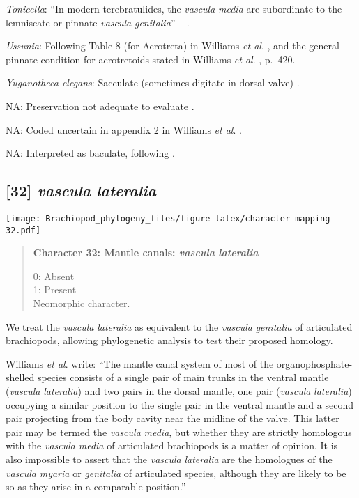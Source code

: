 \documentclass[openany]{book}
\theoremstyle{definition}
\theoremstyle{definition}
\theoremstyle{definition}
\theoremstyle{remark}
\begin{document}
\hypertarget{Tonicella-coding-31}{}
\emph{Tonicella}: ``In modern terebratulides, the \emph{vascula}
\emph{media} are subordinate to the lemniscate or pinnate \emph{vascula}
\emph{genitalia}'' -- \citet{Williams1997Introduction}.

\hypertarget{Ussunia-coding-31}{}
\emph{Ussunia}: Following Table 8 (for Acrotreta) in Williams \emph{et
al}. \citeyearpar{Williams2000LinguliformeaCraniiformea}, and the
general pinnate condition for acrotretoids stated in Williams \emph{et
al}. \citeyearpar{Williams1997Introduction}, p.~420.

\hypertarget{Yuganotheca_elegans-coding-31}{}
\emph{Yuganotheca elegans}: Sacculate (sometimes digitate in dorsal
valve) \citep[p716]{Williams2000LinguliformeaCraniiformea}.

\hypertarget{NA-coding-31}{}
NA: Preservation not adequate to evaluate \citep{Streng2016Anew}.

\hypertarget{NA-coding-31}{}
NA: Coded uncertain in appendix 2 in Williams \emph{et al}.
\citeyearpar{Williams1998Thediversity}.

\hypertarget{NA-coding-31}{}
NA: Interpreted as baculate, following
\citet{Havlicek1982LingulaceaPaterinacea}.

\subsection*{\texorpdfstring{{[}32{]} \emph{vascula}
\emph{lateralia}}{{[}32{]} vascula lateralia}}\label{vascula-lateralia}

\texttt{[image: Brachiopod\_phylogeny\_files/figure-latex/character-mapping-32.pdf]}

\begin{quote}
\textbf{Character 32: Mantle canals: \emph{vascula} \emph{lateralia}}

0: Absent\\
1: Present\\
Neomorphic character.
\end{quote}

We treat the \emph{vascula} \emph{lateralia} as equivalent to the
\emph{vascula} \emph{genitalia} of articulated brachiopods, allowing
phylogenetic analysis to test their proposed homology.

Williams \emph{et al}. \citeyearpar{Williams1997Introduction} write:
``The mantle canal system of most of the organophosphate-shelled species
consists of a single pair of main trunks in the ventral mantle
(\emph{vascula} \emph{lateralia}) and two pairs in the dorsal mantle,
one pair (\emph{vascula} \emph{lateralia}) occupying a similar position
to the single pair in the ventral mantle and a second pair projecting
from the body cavity near the midline of the valve. This latter pair may
be termed the \emph{vascula} \emph{media}, but whether they are strictly
homologous with the \emph{vascula} \emph{media} of articulated
brachiopods is a matter of opinion. It is also impossible to assert that
the \emph{vascula} \emph{lateralia} are the homologues of the
\emph{vascula} \emph{myaria} or \emph{genitalia} of articulated species,
although they are likely to be so as they arise in a comparable
position.''
\end{document}
